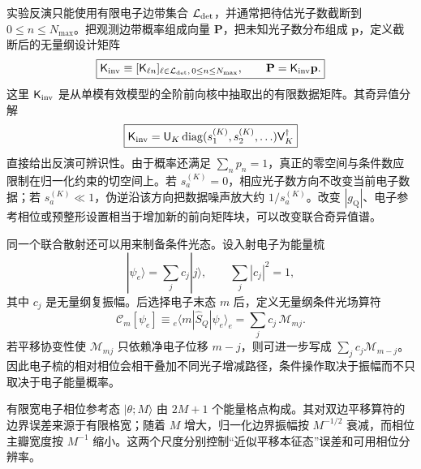 \begin{exbox}[光子统计反演与电子后选择条件操作]
实验反演只能使用有限电子边带集合 $\mathcal L_{\rm det}$，并通常把待估光子数截断到 $0\le n\le N_{\max}$。把观测边带概率组成向量 $\mathbf P$，把未知光子数分布组成 $\mathbf p$，定义截断后的无量纲设计矩阵
\begin{equation}
\boxed{
\mathsf K_{\rm inv}
\equiv[\mathsf K_{\ell n}]_{\ell\in\mathcal L_{\rm det},\,0\le n\le N_{\max}},
\qquad
\mathbf P=\mathsf K_{\rm inv}\mathbf p.}
\label{eq:single_mode_kernel_inverse_problem_dp68}
\end{equation}
这里 $\mathsf K_{\rm inv}$ 是从单模有效模型的全阶前向核中抽取出的有限数据矩阵。其奇异值分解
\begin{equation}
\boxed{
\mathsf K_{\rm inv}
=\mathsf U_K\operatorname{diag}(s_1^{(K)},s_2^{(K)},\ldots)\mathsf V_K^\dagger}
\label{eq:single_mode_kernel_svd}
\end{equation}
直接给出反演可辨识性。由于概率还满足 $\sum_n p_n=1$，真正的零空间与条件数应限制在归一化约束的切空间上。若 $s_a^{(K)}=0$，相应光子数方向不改变当前电子数据；若 $s_a^{(K)}\ll1$，伪逆沿该方向把数据噪声放大约 $1/s_a^{(K)}$。改变 $|g_{\mathrm Q}|$、电子参考相位或预整形设置相当于增加新的前向矩阵块，可以改变联合奇异值谱。

同一个联合散射还可以用来制备条件光态。设入射电子为能量梳
\begin{equation*}
|\psi_e\rangle
=\sum_j c_j|j\rangle,
\qquad
\sum_j|c_j|^2=1,
\end{equation*}
其中 $c_j$ 是无量纲复振幅。后选择电子末态 $m$ 后，定义无量纲条件光场算符
\begin{equation}
\boxed{
\mathscr C_m[\psi_e]
\equiv{}_e\!\langle m|\hat S_Q|\psi_e\rangle_e
=\sum_j c_j\,\mathscr M_{mj}.}
\label{eq:comb_conditioned_kraus-dp19}
\end{equation}
若平移协变性使 $\mathscr M_{mj}$ 只依赖净电子位移 $m-j$，则可进一步写成 $\sum_jc_j\mathscr M_{m-j}$。因此电子梳的相对相位会相干叠加不同光子增减路径，条件操作取决于振幅而不只取决于电子能量概率。

有限宽电子相位参考态 $|\theta;M\rangle$ 由 $2M+1$ 个能量格点构成。其对双边平移算符的边界误差来源于有限格宽；随着 $M$ 增大，归一化边界振幅按 $M^{-1/2}$ 衰减，而相位主瓣宽度按 $M^{-1}$ 缩小。这两个尺度分别控制“近似平移本征态”误差和可用相位分辨率。

\medskip


\end{exbox}
